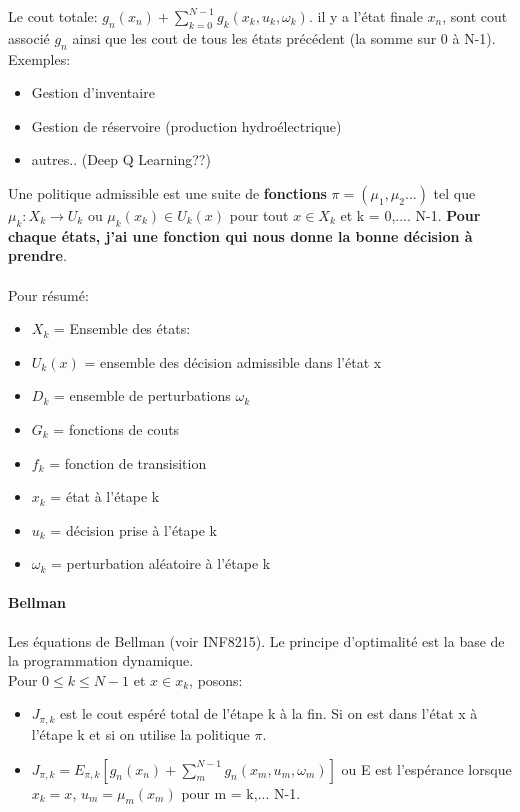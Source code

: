 \documentclass[oneside]{book}
\begin{document}
Le cout totale: $g_n(x_n) + \sum\limits_{k=0}^{N-1}g_k(x_k,u_k,\omega_k)$. il y a l'état finale $x_n$, sont cout associé $g_n$ ainsi que les cout de tous les états précédent (la somme sur 0 à N-1). \\


Exemples:
\begin{itemize}
\item Gestion d'inventaire
\item Gestion de réservoire (production hydroélectrique)
\item autres.. (Deep Q Learning??)
\end{itemize}  

Une politique admissible est une suite de \textbf{fonctions} $  \pi = (\mu_1, \mu_2...)$ tel que $\mu_k : X_k \rightarrow U_k$ ou $\mu_k(x_k) \in U_k(x)$ pour tout $x \in X_k$ et k = 0,.... N-1. \textbf{Pour chaque états, j'ai une fonction qui nous donne la bonne décision à prendre}.\\
 \\
 
 
Pour résumé:
\begin{itemize}
\item $X_k$ = Ensemble des états:
\item $U_k(x)$ = ensemble des décision admissible dans l'état x
\item $D_k$ = ensemble de perturbations $\omega_k$
\item $G_k$ = fonctions de couts
\item $f_k$ = fonction de transisition
\item $x_k$ = état à l'étape k
\item $u_k$ = décision prise à l'étape k
\item $\omega_k$ = perturbation aléatoire à l'étape k
\end{itemize}

\paragraph{Bellman}
Les équations de Bellman (voir INF8215). Le principe d'optimalité est la base de la programmation dynamique.\\

Pour $0\leq k \leq N-1$ et $x \in x_k$, posons:
\begin{itemize}
\item[] $J_{\pi, k}$ est le cout espéré total de l'étape k à la fin. Si on est dans l'état x à l'étape k et si on utilise la politique $\pi$.
\item[] $J_{\pi, k} = E_{\pi,k} [g_n(x_n) + \sum\limits_m^{N-1}g_n(x_m,u_m,\omega_m)]$ ou E est l'espérance lorsque $x_k = x$, $u_m = \mu_m(x_m)$ pour m = k,... N-1.
\end{itemize}
\end{document}
